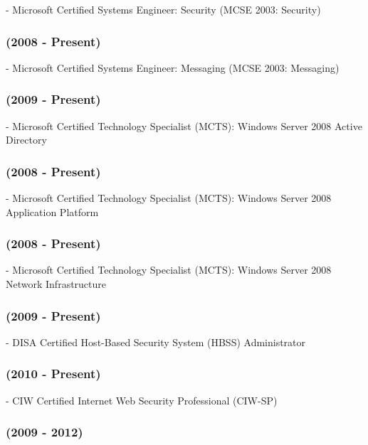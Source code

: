 \documentclass{article}
\begin{document}
{ - Microsoft Certified Systems Engineer: Security (MCSE 2003: Security) } 


{\noindent}\subsubsection { {(2008 - Present)} }

{ - Microsoft Certified Systems Engineer: Messaging (MCSE 2003: Messaging) } 


{\noindent}\subsubsection { {(2009 - Present)} }

{ - Microsoft Certified Technology Specialist (MCTS): Windows Server 2008 Active Directory } 


{\noindent}\subsubsection { {(2008 - Present)} }

{ - Microsoft Certified Technology Specialist (MCTS): Windows Server 2008 Application Platform } 


{\noindent}\subsubsection { {(2008 - Present)} }

{ - Microsoft Certified Technology Specialist (MCTS): Windows Server 2008 Network Infrastructure } 


{\noindent}\subsubsection { {(2009 - Present)} }

{ - DISA Certified Host-Based Security System (HBSS) Administrator } 


{\noindent}\subsubsection { {(2010 - Present)} }

{ - CIW Certified Internet Web Security Professional (CIW-SP) } 


{\noindent}\subsubsection { {(2009 - 2012)} }
\end{document}
